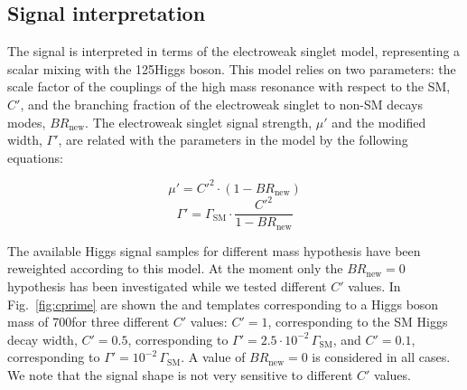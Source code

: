 \subsection{Signal interpretation}
\label{sec:signalModel}

The signal is interpreted in terms of the electroweak singlet model, representing a scalar mixing with the 125\GeV Higgs boson. This model relies on two parameters: the scale factor of the couplings of the high mass resonance with respect to the SM, $C'$, and the branching fraction of the electroweak singlet to non-SM decays modes, $BR_\mathrm{new}$. The electroweak singlet signal strength, $\mu'$ and the modified width, $\Gamma'$, are related with the parameters in the model by the following equations:

\begin{equation}
\mu' = C'^2 \cdot (1 - BR_\mathrm{new})
\end{equation}
\begin{equation}
\Gamma' = \Gamma_\mathrm{SM} \cdot \frac{C'^2}{1 - BR_\mathrm{new}}
\end{equation}

The available Higgs signal samples for different mass hypothesis have been reweighted according to this model. At the moment only the $BR_\mathrm{new} = 0$ hypothesis has been investigated while we tested different $C'$ values.
In Fig.~\ref{fig:cprime} are shown the \mll and \mt templates corresponding to a Higgs boson mass of 700\GeV for three different $C'$ values: $C' = 1$, corresponding to the SM Higgs decay width, $C'=0.5$, corresponding to $\Gamma' = 2.5\cdot10^{-2}\,\Gamma_\mathrm{SM}$, and $C'=0.1$, corresponding to $\Gamma' = 10^{-2}\,\Gamma_\mathrm{SM}$. A value of $BR_\mathrm{new} = 0$ is considered in all cases. We note that the signal shape is not very sensitive to different $C'$ values.

